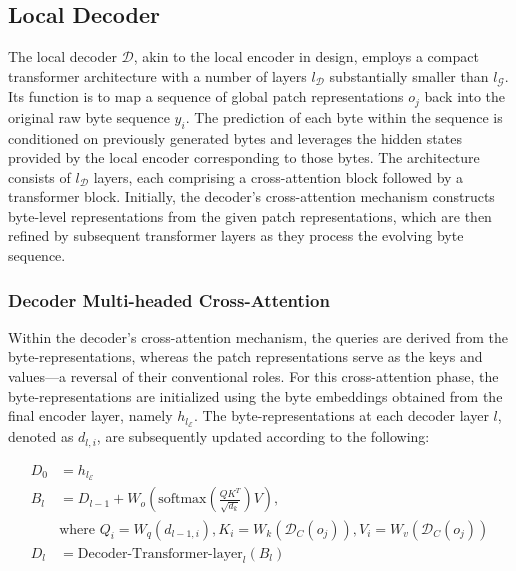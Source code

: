 \subsection{Local Decoder} 

The local decoder $\mathcal{D}$, akin to the local encoder in design, employs a compact transformer architecture with a number of layers $l_{\mathcal{D}}$ substantially smaller than $l_{\mathcal{G}}$. Its function is to map a sequence of global patch representations $o_j$ back into the original raw byte sequence $y_i$. The prediction of each byte within the sequence is conditioned on previously generated bytes and leverages the hidden states provided by the local encoder corresponding to those bytes. The architecture consists of $l_{\mathcal{D}}$ layers, each comprising a cross-attention block followed by a transformer block. Initially, the decoder’s cross-attention mechanism constructs byte-level representations from the given patch representations, which are then refined by subsequent transformer layers as they process the evolving byte sequence.

\subsubsection{Decoder Multi-headed Cross-Attention} 

Within the decoder's cross-attention mechanism, the queries are derived from the byte-representations, whereas the patch representations serve as the keys and values—a reversal of their conventional roles. For this cross-attention phase, the byte-representations are initialized using the byte embeddings obtained from the final encoder layer, namely $h_{l_{\mathcal{E}}}$. The byte-representations at each decoder layer $l$, denoted as $d_{l,i}$, are subsequently updated according to the following:

\begin{align}
D_0 &= h_{l_{\mathcal{E}}} \\
B_l &= D_{l-1} + W_o\left(\text{softmax}\left(\frac{QK^T}{\sqrt{d_k}}\right)V\right), \\
  &\text{where } Q_i = W_q(d_{l-1,i}), K_i = W_k(\mathcal{D}_C(o_j)), V_i = W_v(\mathcal{D}_C(o_j)) \\
  D_l &= \text{Decoder-Transformer-layer}_l(B_l)
\end{align}

